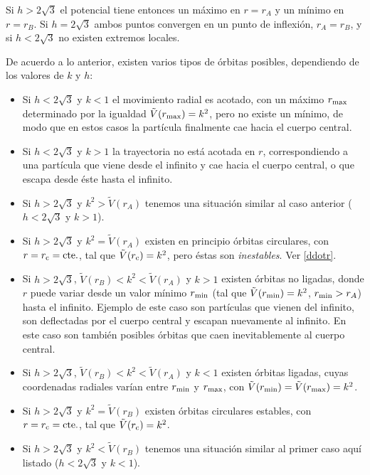 Si $h>2\sqrt{3}$ el potencial tiene entonces un máximo en $r=r_A$ y un mínimo en $r=r_B$. Si $h=2\sqrt{3}$ ambos puntos convergen en un punto de inflexión, $r_A=r_B$, y si $h<2\sqrt{3}$ no existen extremos locales.

De acuerdo a lo anterior, existen varios tipos de órbitas posibles, dependiendo de los valores de $k$ y $h$:

\begin{itemize}
 \item Si $h<2\sqrt{3}$ y $k<1$ el movimiento radial es acotado, con un máximo $r_{\rm max}$ determinado por la igualdad $\tilde{V}(r_{\rm max})=k^2$, pero no existe un mínimo, de modo que en estos casos la partícula finalmente cae hacia el cuerpo central.
\item Si $h<2\sqrt{3}$ y $k>1$ la trayectoria no está acotada en $r$, correspondiendo a una partícula que viene desde el infinito y cae hacia el cuerpo central, o que escapa desde éste hasta el infinito.
\item Si $h>2\sqrt{3}$ y $k^2>\tilde{V}(r_A)$ tenemos una situación similar al caso anterior ($h<2\sqrt{3}$ y $k>1$).
\item Si $h>2\sqrt{3}$ y $k^2=\tilde{V}(r_A)$ existen en principio órbitas circulares, con $r=r_{\rm c}=\text{cte.}$, tal que $\tilde{V}(r_{\rm c})=k^2$, pero éstas son \textit{inestables}. Ver \eqref{ddotr}.
\item Si $h>2\sqrt{3}$, $\tilde{V}(r_B)<k^2<\tilde{V}(r_A)$ y $k>1$ existen órbitas no ligadas, donde $r$ puede variar desde un valor mínimo $r_{\rm min}$ (tal que $\tilde{V}(r_{\rm min})=k^2$, $r_{\rm min}>r_A$) hasta el infinito. Ejemplo de este caso son partículas que vienen del infinito, son deflectadas por el cuerpo central y escapan nuevamente al infinito. En este caso son también posibles órbitas que caen inevitablemente al cuerpo central.
\item Si $h>2\sqrt{3}$, $\tilde{V}(r_B)<k^2<\tilde{V}(r_A)$ y $k<1$ existen órbitas ligadas, cuyas coordenadas radiales varían entre $r_{\rm min}$ y $r_{\rm max}$, con $\tilde{V}(r_{\rm min})=\tilde{V}(r_{\rm max})=k^2$.
\item Si $h>2\sqrt{3}$ y $k^2=\tilde{V}(r_B)$ existen órbitas circulares estables, con $r=r_{\rm c}=\text{cte.}$, tal que $\tilde{V}(r_{\rm c})=k^2$.
\item Si $h>2\sqrt{3}$ y $k^2<\tilde{V}(r_B)$ tenemos una situación similar al primer caso aquí listado ($h<2\sqrt{3}$ y $k<1$).
\end{itemize}

